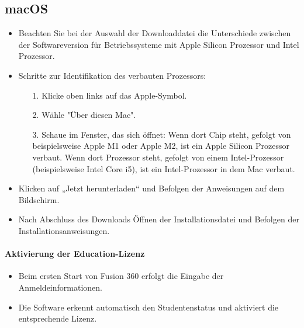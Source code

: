 \subsection*{macOS}
\begin{itemize}
	\item Beachten Sie bei der Auswahl der Downloaddatei die Unterschiede zwischen der Softwareversion für Betriebssysteme mit Apple Silicon Prozessor und Intel Prozessor.
	\item Schritte zur Identifikation des verbauten Prozessors:
	\begin{itemize}
		\item[1.] Klicke oben links auf das Apple-Symbol.
		\item[2.] Wähle "Über diesen Mac".
		\item[3.] Schaue im Fenster, das sich öffnet: \newline
		Wenn dort \glqq Chip\grqq {} steht, gefolgt von beispielsweise \glqq Apple M1\grqq {} oder \glqq Apple M2\grqq {}, ist ein Apple Silicon Prozessor verbaut.\newline
		Wenn dort \glqq Prozessor\grqq {} steht, gefolgt von einem Intel-Prozessor (beispielsweise \glqq Intel Core i5\grqq {}), ist ein Intel-Prozessor in dem Mac verbaut.
	\end{itemize}
	\item Klicken auf „Jetzt herunterladen“ und Befolgen der Anweisungen auf dem Bildschirm.
	\item Nach Abschluss des Downloads Öffnen der Installationsdatei und Befolgen der Installationsanweisungen.
\end{itemize}

\paragraph*{Aktivierung der Education-Lizenz}
\begin{itemize}
	\item Beim ersten Start von Fusion 360 erfolgt die Eingabe der Anmeldeinformationen.
	\item Die Software erkennt automatisch den Studentenstatus und aktiviert die entsprechende Lizenz.
\end{itemize}